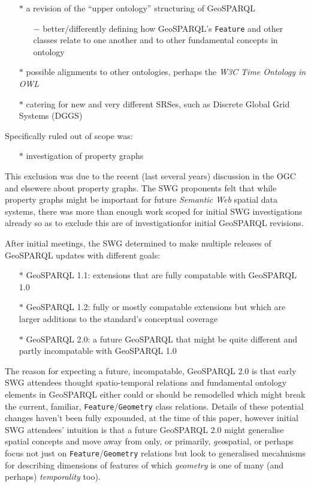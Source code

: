 \documentclass[runningheads]{llncs}
\begin{document}
\begin{itemize}
    \item[$\ast$] a revision of the ``upper  ontology'' structuring of GeoSPARQL
    \begin{itemize}
        \item[$-$] better/differently defining how GeoSPARQL's \texttt{Feature} and other classes relate to one another and to other fundamental concepts in ontology
    \end{itemize} 
    \item[$\ast$] possible alignments to other ontologies, perhaps the \textit{W3C Time Ontology in OWL}\cite{simon_cox_time_2017}
    \item[$\ast$] catering for new and very different SRSes, such as Discrete Global Grid Systems (DGGS) 
\end{itemize}

Specifically ruled out of scope was:

\begin{itemize}
    \item[$\ast$] investigation of property graphs
\end{itemize} 

This exclusion was due to the recent (last several years) discussion in the OGC and elsewere about property graphs. The SWG 
proponents felt that while property graphs might be important for future \textit{Semantic Web} spatial data systems, there was
more than enough work scoped for initial SWG investigations already so as to exclude this are of investigationfor initial 
GeoSPARQL revisions.

After initial meetings, the SWG determined to make multiple releases of GeoSPARQL updates with different goals:

\begin{itemize}
    \item[$\ast$] GeoSPARQL 1.1: extensions that are fully compatable with GeoSPARQL 1.0
    \item[$\ast$] GeoSPARQL 1.2: fully or mostly compatable extensions but which are larger additions to the standard's conceptual coverage
    \item[$\ast$] GeoSPARQL 2.0: a future GeoSPARQL that might be quite different and partly incompatable with GeoSPARQL 1.0
\end{itemize} 

The reason for expecting a future, incompatable, GeoSPARQL 2.0 is that early SWG attendees thought spatio-temporal relations
and fundamental ontology elements in GeoSPARQL either could or should be remodelled which might break the current, familiar, 
\texttt{Feature}/\texttt{Geometry} class relations. Details of these potential changes haven't been fully expounded, at the 
time of this paper, however initial SWG attendees' intuition is that a future GeoSPARQL 2.0 might generalise spatial concepts and
move away from only, or primarily, \textit{geo}spatial, or perhaps focus not just on \texttt{Feature}/\texttt{Geometry} relations
but look to generalised mecahnisms for describing dimensions of features of which \textit{geometry} is one of many (and perhaps)
\textit{temporality} too).
\end{document}
